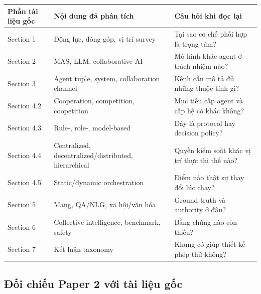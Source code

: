 {\def\LTcaptype{none} %
\begin{longtable}[]{@{}
  >{\raggedright\arraybackslash}p{}
  >{\raggedright\arraybackslash}p{}
  >{\raggedright\arraybackslash}p{}@{}}
\toprule\noalign{}
\begin{minipage}[b]{\linewidth}\raggedright
Phần tài liệu gốc
\end{minipage} & \begin{minipage}[b]{\linewidth}\raggedright
Nội dung đã phân tích
\end{minipage} & \begin{minipage}[b]{\linewidth}\raggedright
Câu hỏi khi đọc lại
\end{minipage} \\
\midrule\noalign{}
\endhead
\bottomrule\noalign{}
\endlastfoot
Section 1 & Động lực, đóng góp, vị trí survey & Tại sao cơ chế phối hợp
là trọng tâm? \\
Section 2 & MAS, LLM, collaborative AI & Mô hình khác agent ở trách
nhiệm nào? \\
Section 3 & Agent tuple, system, collaboration channel & Kênh cần mô tả
đủ những thuộc tính gì? \\
Section 4.2 & Cooperation, competition, coopetition & Mục tiêu cấp agent
và cấp hệ có khác không? \\
Section 4.3 & Rule-, role-, model-based & Đây là protocol hay decision
policy? \\
Section 4.4 & Centralized, decentralized/distributed, hierarchical &
Quyền kiểm soát khác vị trí thực thi thế nào? \\
Section 4.5 & Static/dynamic orchestration & Điểm nào thật sự thay đổi
lúc chạy? \\
Section 5 & Mạng, QA/NLG, xã hội/văn hóa & Ground truth và authority ở
đâu? \\
Section 6 & Collective intelligence, benchmark, safety & Bằng chứng nào
còn thiếu? \\
Section 7 & Kết luận taxonomy & Khung có giúp thiết kế phép thử
không? \\
\end{longtable}
}

\subsection{Đối chiếu Paper 2 với tài liệu
gốc}\label{ux111ux1ed1i-chiux1ebfu-paper-2-vux1edbi-tuxe0i-liux1ec7u-gux1ed1c}

